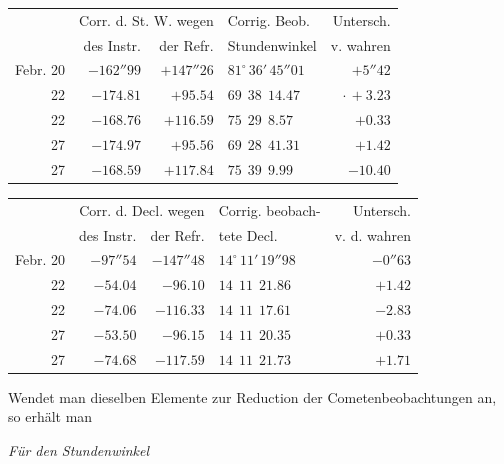 \begin{center}\footnotesize\setlength{\tabcolsep}{4pt}
\begin{tabular}{r|r|r|l|r}
 & \multicolumn{2}{c|}{Corr. d. St. W. wegen} & Corrig. Beob. & Untersch.\\
 & des Instr. & der Refr. & Stundenwinkel & v. wahren \\
\hline
Febr. 20 & $-162''99$ & $+147''26$ & $81^\circ\,36'\,45''01$ & $+5''42$ \\
22 & $-174.81$ & $+95.54$ & $69\ \ 38\ \ 14.47$ & $\mathord{\cdot}\,+3.23$ \\
22 & $-168.76$ & $+116.59$ & $75\ \ 29\ \ 8.57$ & $+0.33$ \\
27 & $-174.97$ & $+95.56$ & $69\ \ 28\ \ 41.31$ & $+1.42$ \\
27 & $-168.59$ & $+117.84$ & $75\ \ 39\ \ 9.99$ & $-10.40$ \\
\end{tabular}
\end{center}

\begin{center}\footnotesize\setlength{\tabcolsep}{4pt}
\begin{tabular}{r|r|r|l|r}
 & \multicolumn{2}{c|}{Corr. d. Decl. wegen} & Corrig. beobach- & Untersch.\\
 & des Instr. & der Refr. & tete Decl. & v. d. wahren \\
\hline
Febr. 20 & $-97''54$ & $-147''48$ & $14^\circ\,11'\,19''98$ & $-0''63$ \\
22 & $-54.04$ & $-96.10$ & $14\ \ 11\ \ 21.86$ & $+1.42$ \\
22 & $-74.06$ & $-116.33$ & $14\ \ 11\ \ 17.61$ & $-2.83$ \\
27 & $-53.50$ & $-96.15$ & $14\ \ 11\ \ 20.35$ & $+0.33$ \\
27 & $-74.68$ & $-117.59$ & $14\ \ 11\ \ 21.73$ & $+1.71$ \\
\end{tabular}
\end{center}

Wendet man dieselben Elemente zur Reduction der Cometenbeobachtungen an, so erhält
man

\begin{center}\footnotesize\setlength{\tabcolsep}{4pt}
\emph{Für den Stundenwinkel}
\end{center}

